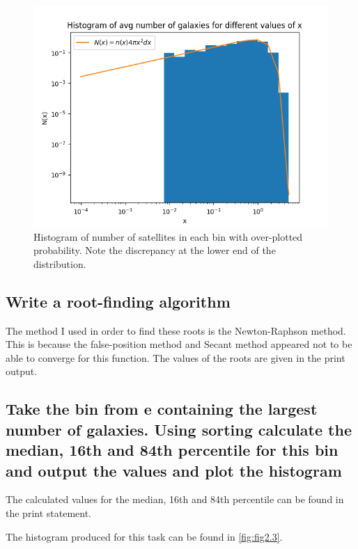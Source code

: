 \documentclass[a4paper,10pt]{article}
\begin{document}
\begin{figure}[h!]
  \centering
  \includegraphics[width=0.9\linewidth]{./plots/2_e.png}
  \caption{Histogram of number of satellites in each bin with over-plotted probability. Note the discrepancy at the lower end of the distribution.}
  \label{fig:fig2.2}
\end{figure}

\subsection{Write a root-finding algorithm}

The method I used in order to find these roots is the Newton-Raphson method. This is because the false-position method and Secant method appeared not to be able to converge for this function. The values of the roots are given in the print output. 

\subsection{Take the bin from e containing the largest number of galaxies. Using sorting calculate the median, 16th and 84th percentile for this bin and output the values and plot the histogram}

The calculated values for the median, 16th and 84th percentile can be found in the print statement. 

The histogram produced for this task can be found in \ref{fig:fig2.3}.
\end{document}
